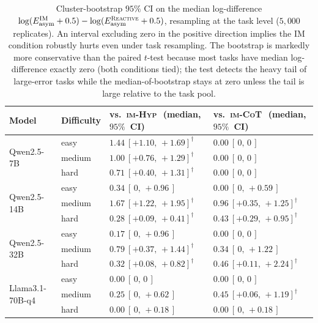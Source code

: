 \documentclass[11pt]{article}
\newcommand{\hurts}{\text{$\dagger$}}
\newcommand{\imhyp}{\textsc{im-Hyp}}
\newcommand{\imcot}{\textsc{im-CoT}}
\newcommand{\reactive}{\textsc{Reactive}}
\newcommand{\errk}{E_{\text{asym}}}
\begin{document}
\begin{table}[t]
\centering
\caption{Cluster-bootstrap $95\%$ CI on the median
log-difference $\log(\errk^{\text{IM}} + 0.5)
- \log(\errk^{\reactive} + 0.5)$, resampling at the task
level ($5{,}000$ replicates).  An interval excluding zero in the
positive direction implies the IM condition robustly hurts even
under task resampling.  The bootstrap is markedly more
conservative than the paired $t$-test because most tasks have
median log-difference exactly zero (both conditions tied);
the test detects the heavy tail of large-error tasks while the
median-of-bootstrap stays at zero unless the tail is large
relative to the task pool.}
\label{tab:bootstrap-v2}
\small
\setlength{\tabcolsep}{3pt}
\begin{tabular}{l l ll}
\toprule
Model & Difficulty
  & vs.\ \imhyp\ \,(median, $95\%$~CI)
  & vs.\ \imcot\ \,(median, $95\%$~CI) \\
\midrule
\multirow{3}{*}{Qwen2.5-7B}
  & easy   & $\mathbf{1.44}\ [+1.10,\,+1.69]^{\hurts}$ & $0.00\ [\,0,\,0\,]$ \\
  & medium & $\mathbf{1.00}\ [+0.76,\,+1.29]^{\hurts}$ & $0.00\ [\,0,\,0\,]$ \\
  & hard   & $\mathbf{0.71}\ [+0.40,\,+1.31]^{\hurts}$ & $0.00\ [\,0,\,0\,]$ \\
\multirow{3}{*}{Qwen2.5-14B}
  & easy   & $0.34\ [\,0,\,+0.96\,]$                   & $0.00\ [\,0,\,+0.59\,]$ \\
  & medium & $\mathbf{1.67}\ [+1.22,\,+1.95]^{\hurts}$ & $\mathbf{0.96}\ [+0.35,\,+1.25]^{\hurts}$ \\
  & hard   & $\mathbf{0.28}\ [+0.09,\,+0.41]^{\hurts}$ & $\mathbf{0.43}\ [+0.29,\,+0.95]^{\hurts}$ \\
\multirow{3}{*}{Qwen2.5-32B}
  & easy   & $0.17\ [\,0,\,+0.96\,]$                   & $0.00\ [\,0,\,0\,]$ \\
  & medium & $\mathbf{0.79}\ [+0.37,\,+1.44]^{\hurts}$ & $0.34\ [\,0,\,+1.22\,]$ \\
  & hard   & $\mathbf{0.32}\ [+0.08,\,+0.82]^{\hurts}$ & $\mathbf{0.46}\ [+0.11,\,+2.24]^{\hurts}$ \\
\multirow{3}{*}{Llama3.1-70B-q4}
  & easy   & $0.00\ [\,0,\,0\,]$                       & $0.00\ [\,0,\,0\,]$ \\
  & medium & $0.25\ [\,0,\,+0.62\,]$                   & $\mathbf{0.45}\ [+0.06,\,+1.19]^{\hurts}$ \\
  & hard   & $0.00\ [\,0,\,+0.18\,]$                   & $0.00\ [\,0,\,+0.18\,]$ \\
\bottomrule
\end{tabular}
\end{table}
\end{document}
